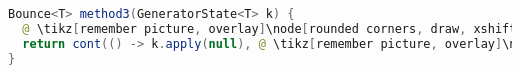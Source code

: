 \begin{center}
\begin{mdframed}
\begin{minipage}[t]{0.6\textwidth}
\begin{lstlisting}[language=Java, numbers=none, breaklines=true]
Bounce<T> method3(GeneratorState<T> k) {
  @ \tikz[remember picture, overlay]\node[rounded corners, draw, xshift=-0.1cm, inner sep=5pt, anchor=west] {Kódrészlet \#2}; \vspace*{0.3cm} @
  return cont(() -> k.apply(null), @ \tikz[remember picture, overlay]\node[rounded corners, draw, xshift=-0.2cm, inner sep=5pt, anchor=west, yshift=0.1cm] {Kifejezés \#2}; \vspace*{0.2cm} \hspace*{1.6cm} @);
}
\end{lstlisting} 
\end{minipage}
\end{mdframed}
\end{center}

\pagebreak

